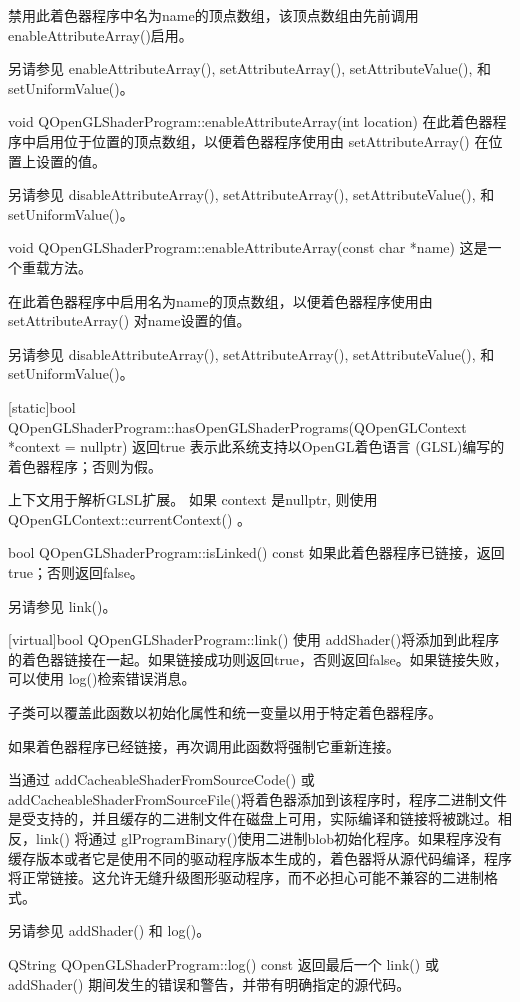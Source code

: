 禁用此着色器程序中名为name的顶点数组，该顶点数组由先前调用 enableAttributeArray()启用。

另请参见 enableAttributeArray(), setAttributeArray(), setAttributeValue(), 和 setUniformValue()。

void QOpenGLShaderProgram::enableAttributeArray(int location)
在此着色器程序中启用位于位置的顶点数组，以便着色器程序使用由 setAttributeArray() 在位置上设置的值。

另请参见 disableAttributeArray(), setAttributeArray(), setAttributeValue(), 和 setUniformValue()。

void QOpenGLShaderProgram::enableAttributeArray(const char *name)
这是一个重载方法。

在此着色器程序中启用名为name的顶点数组，以便着色器程序使用由 setAttributeArray() 对name设置的值。

另请参见 disableAttributeArray(), setAttributeArray(), setAttributeValue(), 和 setUniformValue()。

[static]bool QOpenGLShaderProgram::hasOpenGLShaderPrograms(QOpenGLContext *context = nullptr)
返回true 表示此系统支持以OpenGL着色语言 (GLSL)编写的着色器程序；否则为假。

上下文用于解析GLSL扩展。 如果 context 是nullptr, 则使用QOpenGLContext::currentContext() 。

bool QOpenGLShaderProgram::isLinked() const
如果此着色器程序已链接，返回true；否则返回false。

另请参见 link()。

[virtual]bool QOpenGLShaderProgram::link()
使用 addShader()将添加到此程序的着色器链接在一起。如果链接成功则返回true，否则返回false。如果链接失败，可以使用 log()检索错误消息。

子类可以覆盖此函数以初始化属性和统一变量以用于特定着色器程序。

如果着色器程序已经链接，再次调用此函数将强制它重新连接。

当通过 addCacheableShaderFromSourceCode() 或 addCacheableShaderFromSourceFile()将着色器添加到该程序时，程序二进制文件是受支持的，并且缓存的二进制文件在磁盘上可用，实际编译和链接将被跳过。相反，link() 将通过 glProgramBinary()使用二进制blob初始化程序。如果程序没有缓存版本或者它是使用不同的驱动程序版本生成的，着色器将从源代码编译，程序将正常链接。这允许无缝升级图形驱动程序，而不必担心可能不兼容的二进制格式。

另请参见 addShader() 和 log()。

QString QOpenGLShaderProgram::log() const
返回最后一个 link() 或 addShader() 期间发生的错误和警告，并带有明确指定的源代码。

